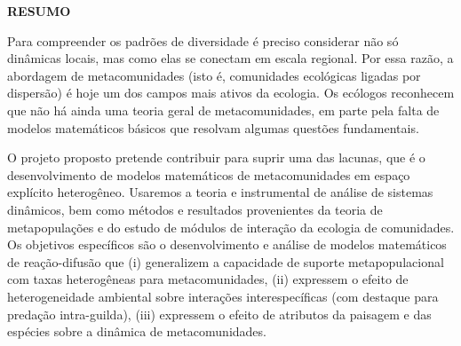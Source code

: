 \documentclass[12pt]{extarticle}
\begin{document}
\setlength{\parindent}{20pt}
\thispagestyle{empty}
\begin{center}
    \bf \Large \color{blue} RESUMO
\end{center}
\vskip 3.0cm
{\it

    Para compreender os padrões de diversidade 
    é preciso considerar não só dinâmicas locais, mas como elas 
    se conectam em escala regional.
    Por essa razão, a abordagem de metacomunidades (isto é, comunidades
    ecológicas ligadas por dispersão) é hoje um dos campos mais ativos da ecologia.
    Os ecólogos reconhecem que não há ainda  uma teoria geral de metacomunidades, em parte
    pela falta de modelos matemáticos básicos que resolvam algumas questões fundamentais.
    
    O projeto proposto pretende contribuir para suprir uma das lacunas, 
    que é o desenvolvimento de modelos matemáticos de metacomunidades 
    em espaço explícito heterogêneo.
    Usaremos a teoria e instrumental de análise de sistemas dinâmicos,
    bem como métodos e resultados provenientes da teoria de
    metapopulações e do estudo de módulos de interação da ecologia de
    comunidades. Os objetivos específicos são o desenvolvimento e análise
    de modelos matemáticos  de reação-difusão que 
    (i) generalizem a capacidade de suporte metapopulacional com taxas heterogêneas para metacomunidades,
    (ii) expressem o efeito de heterogeneidade ambiental sobre interações interespecíficas 
    (com destaque para predação intra-guilda), 
    (iii) expressem o efeito de atributos da paisagem e das espécies sobre a dinâmica
    de metacomunidades.

    
%
%
}

\newpage
\end{document}
